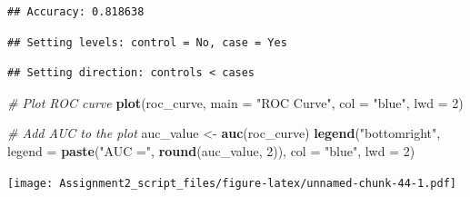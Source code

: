 \documentclass[
]{article}
\newenvironment{Shaded}{\begin{snugshade}}{\end{snugshade}}
\newcommand{\AttributeTok}[1]{\textcolor[rgb]{0.13,0.29,0.53}{#1}}
\newcommand{\CommentTok}[1]{\textcolor[rgb]{0.56,0.35,0.01}{\textit{#1}}}
\newcommand{\DecValTok}[1]{\textcolor[rgb]{0.00,0.00,0.81}{#1}}
\newcommand{\FloatTok}[1]{\textcolor[rgb]{0.00,0.00,0.81}{#1}}
\newcommand{\FunctionTok}[1]{\textcolor[rgb]{0.13,0.29,0.53}{\textbf{#1}}}
\newcommand{\NormalTok}[1]{#1}
\newcommand{\OtherTok}[1]{\textcolor[rgb]{0.56,0.35,0.01}{#1}}
\newcommand{\SpecialCharTok}[1]{\textcolor[rgb]{0.81,0.36,0.00}{\textbf{#1}}}
\newcommand{\StringTok}[1]{\textcolor[rgb]{0.31,0.60,0.02}{#1}}
\begin{document}
\begin{Shaded}
\end{Shaded}

\begin{verbatim}
## Accuracy: 0.818638
\end{verbatim}

\begin{Shaded}
\end{Shaded}

\begin{verbatim}
## Setting levels: control = No, case = Yes
\end{verbatim}

\begin{verbatim}
## Setting direction: controls < cases
\end{verbatim}

\begin{Shaded}
\begin{Highlighting}[]
\CommentTok{\# Plot ROC curve}
\FunctionTok{plot}\NormalTok{(roc\_curve, }\AttributeTok{main =} \StringTok{"ROC Curve"}\NormalTok{, }\AttributeTok{col =} \StringTok{"blue"}\NormalTok{, }\AttributeTok{lwd =} \DecValTok{2}\NormalTok{)}

\CommentTok{\# Add AUC to the plot}
\NormalTok{auc\_value }\OtherTok{\textless{}{-}} \FunctionTok{auc}\NormalTok{(roc\_curve)}
\FunctionTok{legend}\NormalTok{(}\StringTok{"bottomright"}\NormalTok{, }\AttributeTok{legend =} \FunctionTok{paste}\NormalTok{(}\StringTok{"AUC ="}\NormalTok{, }\FunctionTok{round}\NormalTok{(auc\_value, }\DecValTok{2}\NormalTok{)), }\AttributeTok{col =} \StringTok{"blue"}\NormalTok{, }\AttributeTok{lwd =} \DecValTok{2}\NormalTok{)}
\end{Highlighting}
\end{Shaded}

\texttt{[image: Assignment2\_script\_files/figure-latex/unnamed-chunk-44-1.pdf]}
\end{document}
